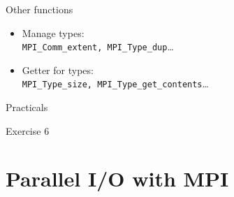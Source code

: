 \documentclass[aspectratio=43]{beamer}
\begin{document}
\begin{frame}[fragile]{Other functions}
\begin{itemize}
    \item Manage types:\\\hspace{1cm}\verb+MPI_Comm_extent, MPI_Type_dup+\ldots
    \item Getter for types:\\\hspace{1cm}\verb+MPI_Type_size, MPI_Type_get_contents+\ldots
\end{itemize}
\end{frame}


\begin{frame}{Practicals}
    \begin{brown2block}{Exercise 6}
    \end{brown2block}
\end{frame}



\section{Parallel I/O with MPI}

\end{document}
